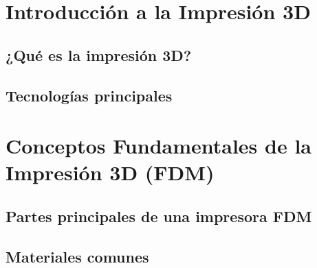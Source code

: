 \section{Introducción a la Impresión 3D}

\subsection{¿Qué es la impresión 3D?}

\subsection{Tecnologías principales}

\section{Conceptos Fundamentales de la Impresión 3D (FDM)}

\subsection{Partes principales de una impresora FDM}

\subsection{Materiales comunes}

